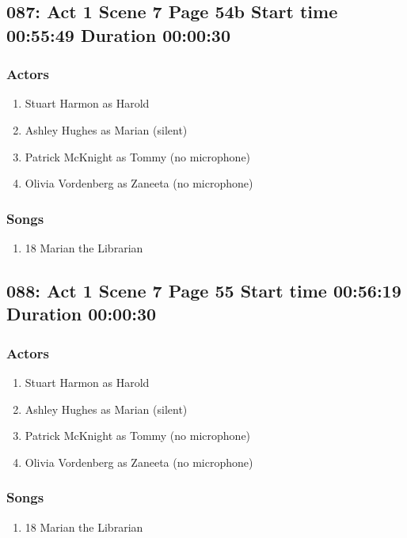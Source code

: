 \subsection{087: Act 1 Scene 7 Page 54b Start time 00:55:49 Duration 00:00:30}

\subsubsection{Actors}
\begin{enumerate}
\item Stuart Harmon as Harold
\item Ashley Hughes as Marian (silent)
\item Patrick McKnight as Tommy (no microphone)
\item Olivia Vordenberg as Zaneeta (no microphone)
\end{enumerate}

\subsubsection{Songs}
\begin{enumerate}
\item 18 Marian the Librarian
\end{enumerate}
\subsection{088: Act 1 Scene 7 Page 55 Start time 00:56:19 Duration 00:00:30}

\subsubsection{Actors}
\begin{enumerate}
\item Stuart Harmon as Harold
\item Ashley Hughes as Marian (silent)
\item Patrick McKnight as Tommy (no microphone)
\item Olivia Vordenberg as Zaneeta (no microphone)
\end{enumerate}

\subsubsection{Songs}
\begin{enumerate}
\item 18 Marian the Librarian
\end{enumerate}
